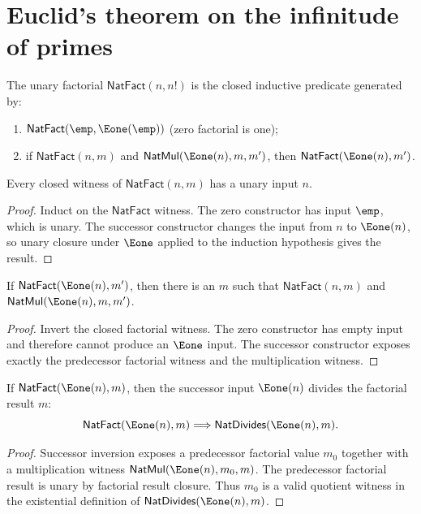 \section{Euclid's theorem on the infinitude of primes}

\begin{definition}
\label{def:unary-factorial}
The unary factorial \(\mathsf{NatFact}(n, n!)\) is the closed inductive predicate generated by:
\begin{enumerate}
  \item \(\mathsf{NatFact}(\emp, \Eone(\emp))\) (zero factorial is one);
  \item if \(\mathsf{NatFact}(n, m)\) and \(\mathsf{NatMul}(\Eone(n), m, m')\), then \(\mathsf{NatFact}(\Eone(n), m')\).
\end{enumerate}
\end{definition}

\begin{lemma}
\label{lem:natfact-input-unary}
Every closed witness of $\mathsf{NatFact}(n,m)$ has a unary input $n$.
\end{lemma}
\begin{proof}
Induct on the $\mathsf{NatFact}$ witness. The zero constructor has input
$\emp$, which is unary. The successor constructor changes the input from $n$
to $\Eone(n)$, so unary closure under $\Eone$ applied to the induction
hypothesis gives the result.
\end{proof}

\begin{lemma}
\label{lem:natfact-successor-inversion}
If $\mathsf{NatFact}(\Eone(n),m')$, then there is an $m$ such that
$\mathsf{NatFact}(n,m)$ and $\mathsf{NatMul}(\Eone(n),m,m')$.
\end{lemma}
\begin{proof}
Invert the closed factorial witness. The zero constructor has empty input and
therefore cannot produce an $\Eone$ input. The successor constructor exposes
exactly the predecessor factorial witness and the multiplication witness.
\end{proof}

\begin{theorem}
\label{thm:natfact-successor-input-divides-result}
If \(\mathsf{NatFact}(\Eone(n),m)\), then the successor input
\(\Eone(n)\) divides the factorial result \(m\):
$$
\mathsf{NatFact}(\Eone(n),m)\Longrightarrow
\mathsf{NatDivides}(\Eone(n),m).
$$
\end{theorem}
\begin{proof}
Successor inversion exposes a predecessor factorial value \(m_0\) together
with a multiplication witness
\(\mathsf{NatMul}(\Eone(n),m_0,m)\). The predecessor factorial result is unary
by factorial result closure. Thus \(m_0\) is a valid quotient witness in the
existential definition of \(\mathsf{NatDivides}(\Eone(n),m)\).
\end{proof}

